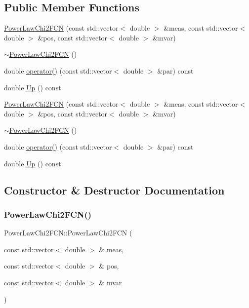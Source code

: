 \subsection*{Public Member Functions}
\begin{DoxyCompactItemize}
\item 
\mbox{\hyperlink{classPowerLawChi2FCN_a8a2490987d4db3ae4af6d45547c7c85e}{Power\+Law\+Chi2\+F\+CN}} (const std\+::vector$<$ double $>$ \&meas, const std\+::vector$<$ double $>$ \&pos, const std\+::vector$<$ double $>$ \&mvar)
\item 
\mbox{\hyperlink{classPowerLawChi2FCN_a7cc194ffd3e8e384faf890572c3a384d}{$\sim$\+Power\+Law\+Chi2\+F\+CN}} ()
\item 
double \mbox{\hyperlink{classPowerLawChi2FCN_a60b7b03daefc8250dcaaa2d4937f4bfc}{operator()}} (const std\+::vector$<$ double $>$ \&par) const
\item 
double \mbox{\hyperlink{classPowerLawChi2FCN_ad202014937fe0e66dffc0fa9061ca9df}{Up}} () const
\item 
\mbox{\hyperlink{classPowerLawChi2FCN_a8a2490987d4db3ae4af6d45547c7c85e}{Power\+Law\+Chi2\+F\+CN}} (const std\+::vector$<$ double $>$ \&meas, const std\+::vector$<$ double $>$ \&pos, const std\+::vector$<$ double $>$ \&mvar)
\item 
\mbox{\hyperlink{classPowerLawChi2FCN_a7cc194ffd3e8e384faf890572c3a384d}{$\sim$\+Power\+Law\+Chi2\+F\+CN}} ()
\item 
double \mbox{\hyperlink{classPowerLawChi2FCN_a60b7b03daefc8250dcaaa2d4937f4bfc}{operator()}} (const std\+::vector$<$ double $>$ \&par) const
\item 
double \mbox{\hyperlink{classPowerLawChi2FCN_ad202014937fe0e66dffc0fa9061ca9df}{Up}} () const
\end{DoxyCompactItemize}


\subsection{Constructor \& Destructor Documentation}
\mbox{\label{classPowerLawChi2FCN_a8a2490987d4db3ae4af6d45547c7c85e}} 
\subsubsection{\texorpdfstring{PowerLawChi2FCN()}{PowerLawChi2FCN()}\hspace{0.1cm}{\footnotesize\ttfamily [1/2]}}
{\footnotesize\ttfamily Power\+Law\+Chi2\+F\+C\+N\+::\+Power\+Law\+Chi2\+F\+CN (\begin{DoxyParamCaption}\item[{const std\+::vector$<$ double $>$ \&}]{meas,  }\item[{const std\+::vector$<$ double $>$ \&}]{pos,  }\item[{const std\+::vector$<$ double $>$ \&}]{mvar }\end{DoxyParamCaption})\hspace{0.3cm}{\ttfamily [inline]}}

